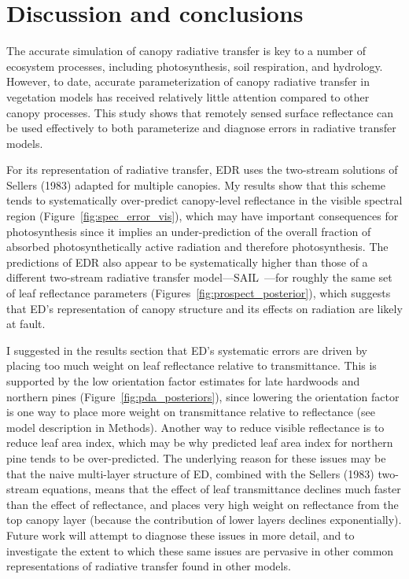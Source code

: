 \section{Discussion and conclusions}

The accurate simulation of canopy radiative transfer is key to a number of ecosystem processes, including photosynthesis, soil respiration, and hydrology.
However, to date, accurate parameterization of canopy radiative transfer in vegetation models has received relatively little attention compared to other canopy processes.
This study shows that remotely sensed surface reflectance can be used effectively to both parameterize and diagnose errors in radiative transfer models.

For its representation of radiative transfer, EDR uses the two-stream solutions of Sellers (1983) adapted for multiple canopies.
My results show that this scheme tends to systematically over-predict canopy-level reflectance in the visible spectral region (Figure~\ref{fig:spec_error_vis}), which may have important consequences for photosynthesis since it implies an under-prediction of the overall fraction of absorbed photosynthetically active radiation and therefore photosynthesis.
The predictions of EDR also appear to be systematically higher than those of a different two-stream radiative transfer model---SAIL~\cite{verhoef_1984_sail}---for roughly the same set of leaf reflectance parameters (Figures~\ref{fig:prospect_posterior}), which suggests that ED's representation of canopy structure and its effects on radiation are likely at fault.

I suggested in the results section that ED's systematic errors are driven by placing too much weight on leaf reflectance relative to transmittance.
This is supported by the low orientation factor estimates for late hardwoods and northern pines (Figure~\ref{fig:pda_posteriors}), since lowering the orientation factor is one way to place more weight on transmittance relative to reflectance (see model description in Methods).
Another way to reduce visible reflectance is to reduce leaf area index, which may be why predicted leaf area index for northern pine tends to be over-predicted.
The underlying reason for these issues may be that the naive multi-layer structure of ED, combined with the Sellers (1983) two-stream equations, means that the effect of leaf transmittance declines much faster than the effect of reflectance, and places very high weight on reflectance from the top canopy layer (because the contribution of lower layers declines exponentially).
Future work will attempt to diagnose these issues in more detail, and to investigate the extent to which these same issues are pervasive in other common representations of radiative transfer found in other models. 
